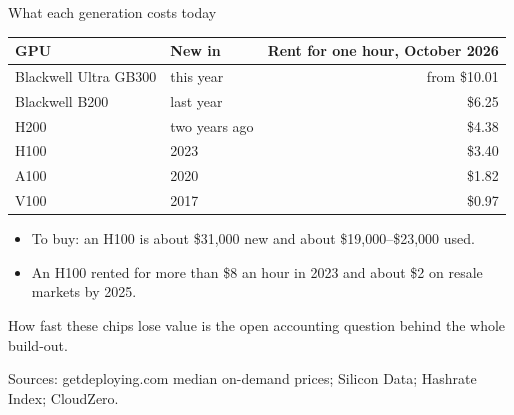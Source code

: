 \documentclass[aspectratio=169,11pt]{beamer}
\begin{document}
\begin{frame}{What each generation costs today}

\begin{center}
\footnotesize
\begin{tabular}{@{}llr@{}}
\toprule
\textbf{GPU} & \textbf{New in} & \textbf{Rent for one hour, October 2026} \\
\midrule
Blackwell Ultra GB300 & this year & from \$10.01 \\
Blackwell B200 & last year & \$6.25 \\
H200 & two years ago & \$4.38 \\
H100 & 2023 & \$3.40 \\
A100 & 2020 & \$1.82 \\
V100 & 2017 & \$0.97 \\
\bottomrule
\end{tabular}
\end{center}

\vspace{0.1cm}

\begin{itemize}\setlength\itemsep{0.15em}
    \item To buy: an H100 is about \$31,000 new and about \$19,000--\$23,000 used.
    \item An H100 rented for more than \$8 an hour in 2023 and about \$2 on resale markets by 2025.
\end{itemize}

\vspace{0.1cm}

\alert{How fast these chips lose value is the open accounting question behind the whole build-out.}

\vspace{0.05cm}
{\scriptsize\color{warmgray}Sources: getdeploying.com median on-demand prices; Silicon Data; Hashrate Index; CloudZero.}

\end{frame}
\end{document}
